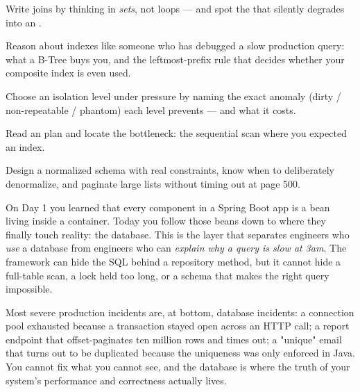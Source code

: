 
\begin{objectives}
\begin{wbitem}
  \item Write joins by thinking in \emph{sets}, not loops --- and spot the  that silently degrades into an .
  \item Reason about indexes like someone who has debugged a slow production query: what a B-Tree buys you, and the leftmost-prefix rule that decides whether your composite index is even used.
  \item Choose an isolation level under pressure by naming the exact anomaly (dirty / non-repeatable / phantom) each level prevents --- and what it costs.
  \item Read an  plan and locate the bottleneck: the sequential scan where you expected an index.
  \item Design a normalized schema with real constraints, know when to deliberately denormalize, and paginate large lists without timing out at page 500.
\end{wbitem}
\end{objectives}


 On Day 1 you learned that every component in a Spring Boot app is a bean living inside a container. Today you follow those beans down to where they finally touch reality: the database. This is the layer that separates engineers who \emph{use} a database from engineers who can \emph{explain why a query is slow at 3am}. The framework can hide the SQL behind a repository method, but it cannot hide a full-table scan, a lock held too long, or a schema that makes the right query impossible.

 Most severe production incidents are, at bottom, database incidents: a connection pool exhausted because a transaction stayed open across an HTTP call; a report endpoint that offset-paginates ten million rows and times out; a "unique" email that turns out to be duplicated because the uniqueness was only enforced in Java. You cannot fix what you cannot see, and the database is where the truth of your system's performance and correctness actually lives.

